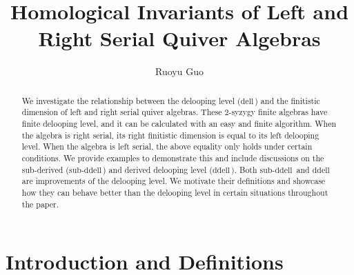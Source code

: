 \documentclass{conm-p-l}
\newcommand{\dell}{\mathrm{dell}\,}
\renewcommand{\dell}{\mathrm{dell}\,}
\newcommand{\ddell}{\mathrm{ddell}\,}
\newcommand{\subddell}{\mathrm{sub}\text{-}\mathrm{ddell}\,}
\theoremstyle{definition}
\theoremstyle{remark}
\numberwithin{equation}{section}
\begin{document}
\title{Homological Invariants of Left and Right Serial Quiver Algebras}


\author{Ruoyu Guo}
\address{415 South Street, Department of Mathematics, Brandeis University, Waltham, MA 02453}
\curraddr{}

\date{}

\maketitle

\begin{abstract}
We investigate the relationship between the delooping level ($\dell\!$) and the finitistic dimension of left and right serial quiver algebras. These 2-syzygy finite algebras have finite delooping level, and it can be calculated with an easy and finite algorithm. When the algebra is right serial, its right finitistic dimension is equal to its left delooping level. When the algebra is left serial, the above equality only holds under certain conditions. We provide examples to demonstrate this and include discussions on the sub-derived ($\subddell\!$) and derived delooping level ($\ddell\!)$. Both $\subddell\!$ and $\ddell\!$ are improvements of the delooping level. We motivate their definitions and showcase how they can behave better than the delooping level in certain situations throughout the paper.
\end{abstract}

\section{Introduction and Definitions}
\end{document}
